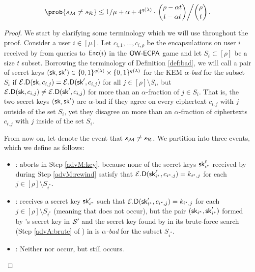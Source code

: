 \begin{lemma}\label{lemma:M}
  \begin{equation}
    \prob{s_{\redM} \ne s_{\redR}}
    \le 1/\mu + \alpha
    + 4^{q(\lambda)} \cdot \left. \binom{\rho - \alpha t}{t - \alpha t} \middle/ \binom{\rho}{t} \right..
  \end{equation}
\end{lemma}

\begin{proof}
  We start by clarifying some terminology which we will use throughout the proof.
  Consider a user \(i \in [\mu]\). Let \(c_{i,1}, \ldots, c_{i,\rho}\) be the encapsulations
  on user \(i\) received by \advA from queries to \(\mathsf{Enc}(i)\) in the
  \(\mathsf{OW}\text{-}\mathsf{ECPA}\) game and let \(S_{i} \subset [\rho]\) be a size \(t\) subset.
  Borrowing the terminology of Definition \ref{def:bad},
  we will call a pair of secret keys \((\mathsf{sk}, \mathsf{sk}') \in \{0,1\}^{q(\lambda)} \times \{0,1\}^{q(\lambda)}\) for the KEM \KEM
  \emph{\(\alpha\)-bad} for the subset \(S_{i}\) if \(\mathcal{E}.\mathsf{D}(\mathsf{sk}, c_{i,j}) = \mathcal{E}.\mathsf{D}(\mathsf{sk}', c_{i,j})\)
  for all \(j \in [\rho] \setminus S_{i}\),
  but \(\mathcal{E}.\mathsf{D}(\mathsf{sk}, c_{i,j}) \ne \mathcal{E}.\mathsf{D}(\mathsf{sk}', c_{i,j})\) for more than an \(\alpha\)-fraction of \(j \in S_{i}\).
  That is, the two secret keys \((\mathsf{sk},\mathsf{sk}')\) are \(\alpha\)-bad if they agree
  on every ciphertext \(c_{i,j}\) with \(j\) outside of the set \(S_{i}\),
  yet they disagree on more than an \(\alpha\)-fraction of ciphertexts
  \(c_{i,j}\) with \(j\) inside of the set \(S_{i}\).

  From now on, let \eventE denote the event that \(s_{\redM} \ne s_{\redR}\).
  We partition \eventE into three events, which we define as follows:
  \begin{itemize}[label={\textbullet},itemsep=0.1cm]
    \item {}: \redM aborts in Step \ref{advM:key},
          because none of the secret keys \(\mathsf{sk}_{i^{*}}^{\ell}\) received by \redM during Step \ref{advM:rewind}
          satisfy that \(\mathcal{E}.\mathsf{D}(\mathsf{sk}_{i^{*}}^{\ell},c_{i^{*},j}) = k_{i^{*},j}\) for each \(j \in [\rho] \setminus S_{i^{*}}\).
    \item {}: \redM receives a secret key \(\mathsf{sk}_{i^{*}}'\) such that
          \(\mathcal{E}.\mathsf{D}(\mathsf{sk}_{i^{*}}',c_{i^{*},j}) = k_{i^{*},j}\) for each \(j \in [\rho] \setminus S_{i^{*}}\)
          (meaning that  does not occur),
          but the pair \((\mathsf{sk}_{i^{*}}, \mathsf{sk}_{i^{*}}')\) formed by \redM's secret key in \(\mathcal{S}'\)
          and the secret key found by \advA in its brute-force search (Step \ref{advA:brute} of \advA)
          in \Simple is \emph{\(\alpha\)-bad} for the subset \(S_{i^{*}}\).
    \item {}: Neither  nor  occur, but \eventE still occurs.
  \end{itemize}


\end{proof}
